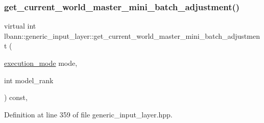 \subsubsection{\texorpdfstring{get\+\_\+current\+\_\+world\+\_\+master\+\_\+mini\+\_\+batch\+\_\+adjustment()}{get\_current\_world\_master\_mini\_batch\_adjustment()}\hspace{0.1cm}{\footnotesize\ttfamily [1/2]}}
{\footnotesize\ttfamily virtual int lbann\+::generic\+\_\+input\+\_\+layer\+::get\+\_\+current\+\_\+world\+\_\+master\+\_\+mini\+\_\+batch\+\_\+adjustment (\begin{DoxyParamCaption}\item[{\hyperlink{base_8hpp_a2781a159088df64ed7d47cc91c4dc0a8}{execution\+\_\+mode}}]{mode,  }\item[{int}]{model\+\_\+rank }\end{DoxyParamCaption}) const\hspace{0.3cm}{\ttfamily [inline]}, {\ttfamily [virtual]}}



Definition at line 359 of file generic\+\_\+input\+\_\+layer.\+hpp.



